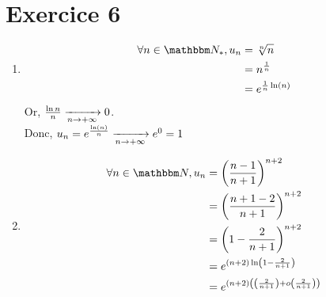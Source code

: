 \part{Exercice 6}

\begin{enumerate}
	\item 
		\begin{align*}
			\forall n \in \N_*,
			u_n &= \sqrt[n]{n} \\
			&= n^{\frac{1}{n}} \\
			&= e^{\frac{1}{n}\ln(n)} \\
		\end{align*}
		Or, $\frac{\ln n}{n} \xrightarrow[n \to +\infty]{} 0$.\\
		Donc, $u_n = e^{\frac{\ln(n)}{n}} \xrightarrow[n \to  +\infty]{} e^0 = 1$
	\item
		\begin{align*}
			\forall n \in \N,
			u_n &= \left( \frac{n-1}{n+1} \right) ^{n+2}\\
			&= \left( \frac{n + 1 - 2}{n + 1} \right)^{n+2}\\
			&= \left( 1 - \frac{2}{n+1} \right) ^{n+2} \\
			&= e^{(n+2) \ln\left( 1 - \frac{2}{n+1} \right) } \\
			&= e^{(n+2)\left( \left( \frac{2}{n+1} \right) + o\left( \frac{2}{n+1} \right)\right) } \\
		\end{align*}
\end{enumerate}

